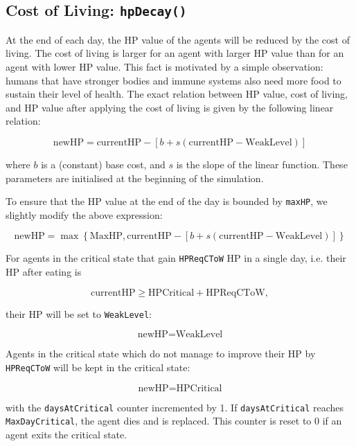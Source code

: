 \subsection{Cost of Living: \lstinline$hpDecay()$}\label{hpDecay}
At the end of each day, the HP value of the agents will be reduced by the cost of living. The cost of living is larger for an agent with larger HP value than for an agent with lower HP value. This fact is motivated by a simple observation: humans that have stronger bodies and immune systems also need more food to sustain their level of health. The exact relation between HP value, cost of living, and HP value after applying the cost of living is given by the following linear relation:

\begin{equation}\label{hpDecay}
    \text{newHP} = \text{currentHP}-\left[b + s(\text{currentHP}-\text{WeakLevel})\right]
\end{equation}


where $b$ is a (constant) base cost, and $s$ is the slope of the linear function. These parameters are initialised at the beginning of the simulation. 

To ensure that the HP value at the end of the day is bounded by \texttt{maxHP}, we slightly modify the above expression:

\begin{equation}\label{hpDecay_bounded}
    \text{newHP} =\max\left\{\text{MaxHP}, \text{currentHP}-\left[b + s(\text{currentHP}-\text{WeakLevel})\right]\right\}
\end{equation}

For agents in the critical state that gain \texttt{HPReqCToW} HP in a single day, i.e. their HP after eating is

\begin{equation}\label{HPReqCToW}
    \text{currentHP} \geq \text{HPCritical}+\text{HPReqCToW},
\end{equation}

their HP will be set to \texttt{WeakLevel}:

\begin{equation}\label{hpDecay_critical_upgrade}
    \text{newHP} = \text{WeakLevel}
\end{equation}

Agents in the critical state which do not manage to improve their HP by \lstinline$HPReqCToW$ will be kept in the critical state:

\begin{equation}\label{hpDecay_critical_stay}
    \text{newHP} = \text{HPCritical}
\end{equation}

with the \texttt{daysAtCritical} counter incremented by 1. If \texttt{daysAtCritical} reaches \texttt{MaxDayCritical}, the agent dies and is replaced. This counter is reset to 0 if an agent exits the critical state.